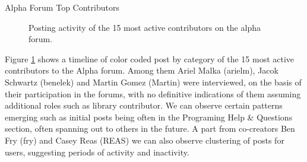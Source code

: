 \cleardoublepage
\changepapersize{305.3mm:210mm}
{
	\LARGE
	\noindent Alpha Forum Top Contributors\par
	\vspace{0.2cm} 
}
\vfill

\begin{figure}[h!]
	\centering
	\caption{Posting activity of the 15 most active contributors on the alpha forum.}
	\label{fig:processing-alpha-dot}
\end{figure}

\begin{multicols}{3}
	\noindent
  Figure \ref*{fig:processing-alpha-dot} shows a timeline of color coded post by category of the 15 most active contributors to the Alpha forum. Among them Ariel Malka (arielm), Jacok Schwartz (benelek) and Martin Gomez (Martin) were interviewed, on the basis of their participation in the forums, with no definitive indications of them assuming additional roles such as library contributor. We can observe certain patterns emerging such as initial posts being often in the Programing Help \& Questions section, often spanning out to others in the future. A part from co-creators Ben Fry (fry) and Casey Reas (REAS) we can also observe clustering of posts for users, suggesting periods of activity and inactivity. 
  \columnbreak

  \vfill\null
\end{multicols}

